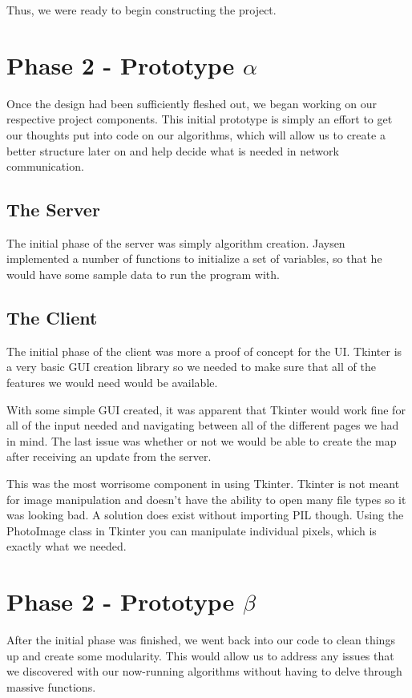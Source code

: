 Thus, we were ready to begin constructing the project.

\section{Phase 2 - Prototype $\alpha$}
Once the design had been sufficiently fleshed out, we began working on our 
respective project components. This initial prototype is simply an effort to get
our thoughts put into code on our algorithms, which will allow us to create a
better structure later on and help decide what is needed in network communication.

\subsection{The Server}
The initial phase of the server was simply algorithm creation. Jaysen implemented
a number of functions to initialize a set of variables, so that he would have some
sample data to run the program with.

\subsection{The Client}
The initial phase of the client was more a proof of concept for the UI. Tkinter is a very basic GUI creation library so we needed to make sure that all of the features we would need would be available.

With some simple GUI created, it was apparent that Tkinter would work fine for all of the input needed and navigating between all of the different pages we had in mind. The last issue was whether or not we would be able to create the map after receiving an update from the server.

This was the most worrisome component in using Tkinter. Tkinter is not meant for image manipulation and doesn't have the ability to open many file types so it was looking bad. A solution does exist without importing PIL though. Using the PhotoImage class in Tkinter you can manipulate individual pixels, which is exactly what we needed.

\section{Phase 2 - Prototype $\beta$}
After the initial phase was finished, we went back into our code to clean things up
and create some modularity. This would allow us to address any issues that we
discovered with our now-running algorithms without having to delve through massive
functions.

